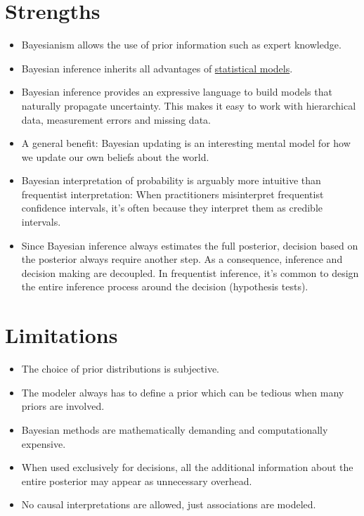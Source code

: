 \documentclass[
  10pt,
]{scrbook}
\providecommand{\tightlist}{%
  \setlength{\itemsep}{0pt}\setlength{\parskip}{0pt}}
\begin{document}
\hypertarget{strengths-2}{%
\section{Strengths}\label{strengths-2}}

\begin{itemize}
\tightlist
\item
  Bayesianism allows the use of prior information such as expert knowledge.
\item
  Bayesian inference inherits all advantages of \protect\hyperlink{statistical-modeling}{statistical models}.
\item
  Bayesian inference provides an expressive language to build models that naturally propagate uncertainty. This makes it easy to work with hierarchical data, measurement errors and missing data.
\item
  A general benefit: Bayesian updating is an interesting mental model for how we update our own beliefs about the world.
\item
  Bayesian interpretation of probability is arguably more intuitive than frequentist interpretation: When practitioners misinterpret frequentist confidence intervals, it's often because they interpret them as credible intervals.
\item
  Since Bayesian inference always estimates the full posterior, decision based on the posterior always require another step. As a consequence, inference and decision making are decoupled. In frequentist inference, it's common to design the entire inference process around the decision (hypothesis tests).
\end{itemize}

\hypertarget{limitations-2}{%
\section{Limitations}\label{limitations-2}}

\begin{itemize}
\tightlist
\item
  The choice of prior distributions is subjective.
\item
  The modeler always has to define a prior which can be tedious when many priors are involved.
\item
  Bayesian methods are mathematically demanding and computationally expensive.
\item
  When used exclusively for decisions, all the additional information about the entire posterior may appear as unnecessary overhead.
\item
  No causal interpretations are allowed, just associations are modeled.
\end{itemize}
\end{document}
